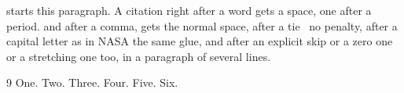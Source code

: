 \documentclass{article}
\begin{document}
\cite{a} starts this paragraph. A citation right after a word\cite{b} gets a space, one after a period. \cite{c} and after a comma, \cite{d} gets the normal space, after a tie~\cite{e} no penalty, after a capital letter as in NASA \cite{f} the same glue, and after an explicit skip\hspace{1em}\cite{a} or a zero one\hspace{0pt}\cite{b} or a stretching one\hfil\cite{c} too, in a paragraph of several lines.

\begin{thebibliography}{9}
 One.
 Two.
 Three.
 Four.
 Five.
 Six.
\end{thebibliography}
\end{document}
